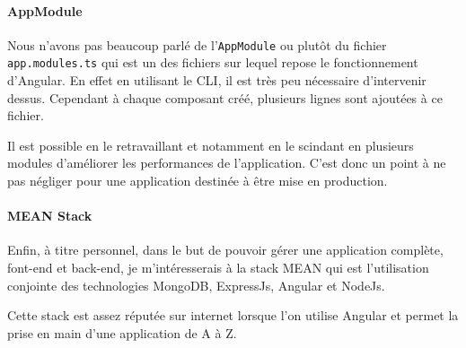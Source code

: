 \paragraph{AppModule}
Nous n'avons pas beaucoup parlé de l'\texttt{AppModule} ou plutôt du fichier \texttt{app.modules.ts} qui est un des fichiers sur lequel repose le fonctionnement d'Angular. En effet en utilisant le CLI, il est très peu nécessaire d'intervenir dessus. Cependant à chaque composant créé, plusieurs lignes sont ajoutées à ce fichier. 

Il est possible en le retravaillant et notamment en le scindant en plusieurs modules d'améliorer les performances de l'application. C'est donc un point à ne pas négliger pour une application destinée à être mise en production.

\paragraph{MEAN Stack}
Enfin, à titre personnel, dans le but de pouvoir gérer une application complète, font-end et back-end, je m'intéresserais à la stack MEAN qui est l'utilisation conjointe des technologies MongoDB, ExpressJs, Angular et NodeJs.

Cette stack est assez réputée sur internet lorsque l'on utilise Angular et permet la prise en main d'une application de A à Z.

